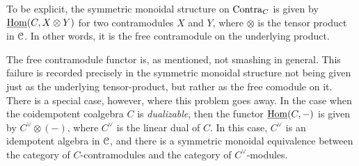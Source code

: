 \begin{remark}
    To be explicit, the symmetric monoidal structure on $\mathrm{Contra}_C$ is given by $\operatorname{\underline{Hom}}(C, X\otimes Y)$ for two contramodules $X$ and $Y$, where $\otimes$ is the tensor product in $\EuScript{C}$. In other words, it is the free contramodule on the underlying product. 
\end{remark}

\begin{remark}
    The free contramodule functor is, as mentioned, not smashing in general. This failure is recorded precisely in the symmetric monoidal structure not being given just as the underlying tensor-product, but rather as the free comodule on it. There is a special case, however, where this problem goes away. In the case when the coidempotent coalgebra $C$ is \emph{dualizable}, then the functor $\operatorname{\underline{Hom}}(C,-)$ is given by $C^\vee \otimes (-)$, where $C^\vee$ is the linear dual of $C$. In this case, $C^\vee$ is an idempotent algebra in $\EuScript{C}$, and there is a symmetric monoidal equivalence between the category of $C$-contramodules and the category of $C^\vee$-modules. 
\end{remark}







